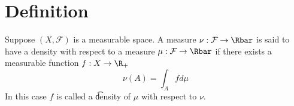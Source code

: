 

\section*{Definition}

Suppose $(X, \mathcal{F} )$ is a measurable space.
A measure $\nu : \mathcal{F}  \to \Rbar$ is said to have a density with respect to a measure $\mu : \mathcal{F}  \to \Rbar$ if there exists a measurable function $f: X \to \R _+$
\[
\nu (A) = \int _A f d\mu
\]
In this case $f$ is called a \t{density} of $\mu $ with respect to $\nu $.

\blankpage